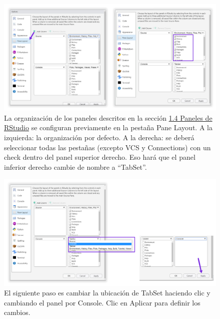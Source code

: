 \documentclass[
]{article}
\theoremstyle{definition}
\theoremstyle{definition}
\theoremstyle{definition}
\theoremstyle{definition}
\theoremstyle{remark}
\begin{document}
\begin{figure}

{\centering \includegraphics[width=1\linewidth]{figs/screenshots/configRStudio-7} 

}

\caption{La organización de los paneles descritos en la sección \protect\hyperlink{panelesRStudio}{1.4 Paneles de RStudio} se configuran previamente en la pestaña Pane Layout. A la izquierda: la organización por defecto. A la derecha: se deberá seleccionar todas las pestañas (excepto VCS y Connections) con un check dentro del panel superior derecho. Eso hará que el panel inferior derecho cambie de nombre a ``TabSet''.}\label{fig:figura7}
\end{figure}



\begin{figure}

{\centering \includegraphics[width=1\linewidth]{figs/screenshots/configRStudio-8} 

}

\caption{El siguiente paso es cambiar la ubicación de TabSet haciendo clic y cambiando el panel por Console. Clic en Aplicar para definir los cambios.}\label{fig:figura8}
\end{figure}
\end{document}
